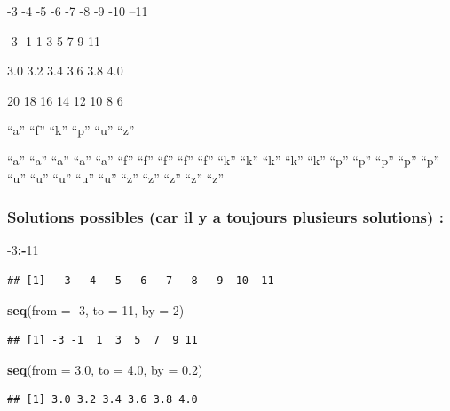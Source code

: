 \documentclass[
]{book}
\newenvironment{Shaded}{\begin{snugshade}}{\end{snugshade}}
\newcommand{\DataTypeTok}[1]{\textcolor[rgb]{0.13,0.29,0.53}{#1}}
\newcommand{\DecValTok}[1]{\textcolor[rgb]{0.00,0.00,0.81}{#1}}
\newcommand{\FloatTok}[1]{\textcolor[rgb]{0.00,0.00,0.81}{#1}}
\newcommand{\KeywordTok}[1]{\textcolor[rgb]{0.13,0.29,0.53}{\textbf{#1}}}
\newcommand{\NormalTok}[1]{#1}
\newcommand{\OperatorTok}[1]{\textcolor[rgb]{0.81,0.36,0.00}{\textbf{#1}}}
\begin{document}
-3 -4 -5 -6 -7 -8 -9 -10 --11

-3 -1 1 3 5 7 9 11

3.0 3.2 3.4 3.6 3.8 4.0

20 18 16 14 12 10 8 6

``a'' ``f'' ``k'' ``p'' ``u'' ``z''

``a'' ``a'' ``a'' ``a'' ``a'' ``f'' ``f'' ``f'' ``f'' ``f'' ``k'' ``k'' ``k'' ``k'' ``k'' ``p'' ``p'' ``p'' ``p'' ``p'' ``u'' ``u'' ``u'' ``u'' ``u'' ``z'' ``z'' ``z'' ``z'' ``z''

\hypertarget{solutions-possibles-car-il-y-a-toujours-plusieurs-solutions}{%
\subsubsection{Solutions possibles (car il y a toujours plusieurs solutions) :}\label{solutions-possibles-car-il-y-a-toujours-plusieurs-solutions}}

\begin{Shaded}
\begin{Highlighting}[]
\DecValTok{-3}\OperatorTok{:-}\DecValTok{11}
\end{Highlighting}
\end{Shaded}

\begin{verbatim}
## [1]  -3  -4  -5  -6  -7  -8  -9 -10 -11
\end{verbatim}

\begin{Shaded}
\begin{Highlighting}[]
\KeywordTok{seq}\NormalTok{(}\DataTypeTok{from =} \DecValTok{-3}\NormalTok{, }\DataTypeTok{to =} \DecValTok{11}\NormalTok{, }\DataTypeTok{by =} \DecValTok{2}\NormalTok{)}
\end{Highlighting}
\end{Shaded}

\begin{verbatim}
## [1] -3 -1  1  3  5  7  9 11
\end{verbatim}

\begin{Shaded}
\begin{Highlighting}[]
\KeywordTok{seq}\NormalTok{(}\DataTypeTok{from =} \FloatTok{3.0}\NormalTok{, }\DataTypeTok{to =} \FloatTok{4.0}\NormalTok{, }\DataTypeTok{by =} \FloatTok{0.2}\NormalTok{)}
\end{Highlighting}
\end{Shaded}

\begin{verbatim}
## [1] 3.0 3.2 3.4 3.6 3.8 4.0
\end{verbatim}
\end{document}
